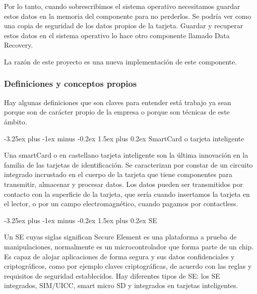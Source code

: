 \documentclass[12pt]{article}
\makeatletter
\renewcommand{\paragraph}{\@startsection{paragraph}{4}{0ex}%
   {-3.25ex plus -1ex minus -0.2ex}%
   {1.5ex plus 0.2ex}%
   {\normalfont\normalsize\bfseries}}
\makeatother
\begin{document}
    \vspace{4mm}
    
    Por lo tanto, cuando sobrescribimos el sistema operativo necesitamos guardar estos datos en la memoria del componente para no perderlos. Se podría ver como una copia de seguridad de los datos propios de la tarjeta. Guardar y recuperar estos datos en el sistema operativo lo hace otro componente llamado Data Recovery.
    
    \vspace{4mm}
    
    La razón de este proyecto es una nueva implementación de este componente.
    
        
    \subsubsection{Definiciones y conceptos propios}
    Hay algunas definiciones que son claves para entender está trabajo ya sean porque son de carácter propio de la empresa o porque son técnicas de este ámbito.
    
     \paragraph{SmartCard o tarjeta inteligente}
    
    Una smartCard o en castellano tarjeta inteligente son la última innovación en la familia de las tarjetas de identificación. Se caracterizan por constar de un circuito integrado incrustado en el cuerpo de la tarjeta que tiene componentes para transmitir, almacenar y procesar datos. Los datos pueden ser transmitidos por contacto con la superficie de la tarjeta, que sería cuando insertamos la tarjeta en el lector, o por un campo electromagnético, cuando pagamos por contactless. ~\cite{3}

    \paragraph{SE}

    Un SE cuyas siglas significan Secure Element es una plataforma a prueba de manipulaciones, normalmente es un microcontrolador que forma parte de un chip. Es capaz de alojar aplicaciones de forma segura y sus datos confidenciales y criptográficos, como por ejemplo claves criptográficas, de acuerdo con las reglas y requisitos de seguridad establecidos.
    Hay diferentes tipos de SE: los SE integrados, SIM/UICC, smart micro SD y integrados en tarjetas inteligentes.~\cite{4}
\end{document}
